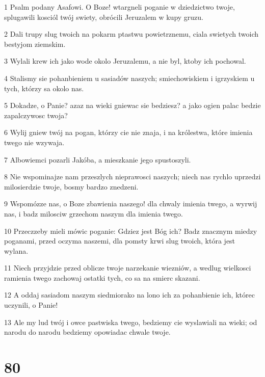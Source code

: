 \par 1 Psalm podany Asafowi. O Boze! wtargneli poganie w dziedzictwo twoje, splugawili kosciól twój swiety, obrócili Jeruzalem w kupy gruzu.
\par 2 Dali trupy slug twoich na pokarm ptastwu powietrznemu, ciala swietych twoich bestyjom ziemskim.
\par 3 Wylali krew ich jako wode okolo Jeruzalemu, a nie byl, ktoby ich pochowal.
\par 4 Stalismy sie pohanbieniem u sasiadów naszych; smiechowiskiem i igrzyskiem u tych, którzy sa okolo nas.
\par 5 Dokadze, o Panie? azaz na wieki gniewac sie bedziesz? a jako ogien palac bedzie zapalczywosc twoja?
\par 6 Wylij gniew twój na pogan, którzy cie nie znaja, i na królestwa, które imienia twego nie wzywaja.
\par 7 Albowiemci pozarli Jakóba, a mieszkanie jego spustoszyli.
\par 8 Nie wspominajze nam przeszlych nieprawosci naszych; niech nas rychlo uprzedzi milosierdzie twoje, bosmy bardzo znedzeni.
\par 9 Wspomózze nas, o Boze zbawienia naszego! dla chwaly imienia twego, a wyrwij nas, i badz milosciw grzechom naszym dla imienia twego.
\par 10 Przeczzeby mieli mówic poganie: Gdziez jest Bóg ich? Badz znacznym miedzy poganami, przed oczyma naszemi, dla pomsty krwi slug twoich, która jest wylana.
\par 11 Niech przyjdzie przed oblicze twoje narzekanie wiezniów, a wedlug wielkosci ramienia twego zachowaj ostatki tych, co sa na smierc skazani.
\par 12 A oddaj sasiadom naszym siedmiorako na lono ich za pohanbienie ich, którec uczynili, o Panie!
\par 13 Ale my lud twój i owce pastwiska twego, bedziemy cie wyslawiali na wieki; od narodu do narodu bedziemy opowiadac chwale twoje.

\chapter{80}

